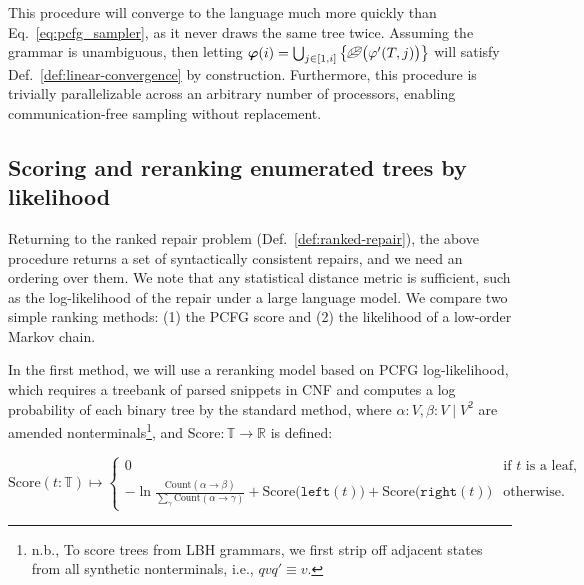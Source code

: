 \documentclass[sigplan,acmsmall,nonacm,screen]{acmart}\settopmatter{printfolios=false,printccs=false,printacmref=false}
\begin{document}
  This procedure will converge to the language much more quickly than Eq.~\ref{eq:pcfg_sampler}, as it never draws the same tree twice. Assuming the grammar is unambiguous, then letting $\bm\varphi(i) = \bigcup_{j\in[1, i]} \big\{\text{\textleaf}\big(\varphi'(T, j)\big)\big\}$ will satisfy Def.~\ref{def:linear-convergence} by construction. Furthermore, this procedure is trivially parallelizable across an arbitrary number of processors, enabling communication-free sampling without replacement. %

\subsection{Scoring and reranking enumerated trees by likelihood}\label{sec:ranking}

Returning to the ranked repair problem (Def.~\ref{def:ranked-repair}), the above procedure returns a set of syntactically consistent repairs, and we need an ordering over them. We note that any statistical distance metric is sufficient, such as the log-likelihood of the repair under a large language model. We compare two simple ranking methods: (1) the PCFG score and (2) the likelihood of a low-order Markov chain.

In the first method, we will use a reranking model based on PCFG log-likelihood, which requires a treebank of parsed snippets in CNF and computes a log probability of each binary tree by the standard method, where $\alpha: V, \beta: V \mid V^2$ are amended nonterminals\footnote{n.b., To score trees from LBH grammars, we first strip off adjacent states from all synthetic nonterminals, i.e., $qvq' \equiv v$.}, and Score$: \mathbb{T} \rightarrow \mathbb{R}$ is defined:

\begin{equation}
\text{Score}(t: \mathbb{T}) \mapsto \begin{cases}
0 & \text{if $t$ is a leaf,} \\
-\ln\frac{\text{Count}(\alpha \rightarrow \beta)}{\sum_{\gamma}\text{Count}(\alpha \rightarrow \gamma)} + \text{Score}\big(\texttt{left}(t)\big) + \text{Score}\big(\texttt{right}(t)\big) & \text{otherwise.}
\end{cases}
\end{equation}
\end{document}
